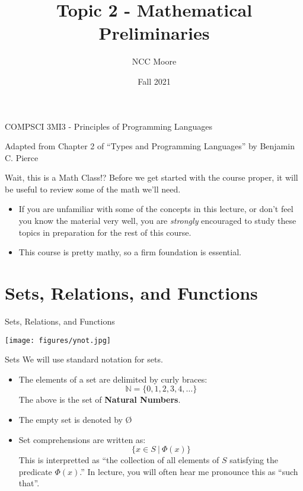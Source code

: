 \documentclass[11pt]{beamer}
\author{NCC Moore}
\title{Topic 2 - Mathematical Preliminaries}
\institute{McMaster University}
\date{Fall 2021}
\begin{document}
\begin{frame}
\center
COMPSCI 3MI3 - Principles of Programming Languages
\titlepage

Adapted from Chapter 2 of ``Types and Programming Languages'' by Benjamin C. Pierce 
\end{frame}

\begin{frame}
\tableofcontents
\end{frame}

\begin{frame}[fragile=singleslide]{Wait, this is a Math Class!?}
Before we get started with the course proper, it will be useful to review some of the math we'll need.  
\begin{itemize}
\item If you are unfamiliar with some of the concepts in this lecture, or don't feel you know the material very well, you are \emph{strongly} encouraged to study these topics in preparation for the rest of this course.   
\item This course is pretty mathy, so a firm foundation is essential.  
\end{itemize}
\end{frame}

\section[Set Basics]{Sets, Relations, and Functions}
\begin{frame}[fragile=singleslide]{Sets, Relations, and Functions}
\begin{center}
\texttt{[image: figures/ynot.jpg]}
\end{center}
\end{frame}

\begin{frame}[fragile=singleslide]{Sets}
We will use standard notation for sets.
\begin{itemize}
\item The elements of a set are delimited by curly braces: 
\begin{equation}
\mathbb{N} = \{0,1,2,3,4,\dots\} 
\end{equation}
The above is the set of \textbf{Natural Numbers}.
\item The empty set is denoted by \O
\item Set comprehensions are written as:
\begin{equation}
\{ x \in S\:|\:\Phi(x) \}
\end{equation}
This is interpretted as ``the collection of all elements of $S$ satisfying the predicate $\Phi(x)$.''  In lecture, you will often hear me pronounce this as ``such that''.
\end{itemize}
\end{frame}
\end{document}
